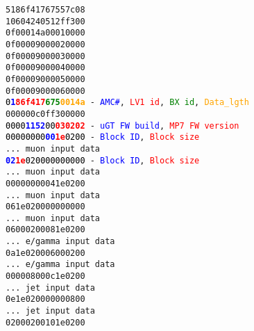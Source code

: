 \texttt{5186f41767557c08}\\
\texttt{10604240512ff300}\\
\texttt{0f00014a00010000}\\
\texttt{0f00009000020000}\\
\texttt{0f00009000030000}\\
\texttt{0f00009000040000}\\
\texttt{0f00009000050000}\\
\texttt{0f00009000060000}\\
\texttt{\textcolor{black}{0}\textcolor{blue}{\textbf{1}}\textcolor{red}{\textbf{86f417}}\textcolor{green}{\textbf{675}}\textcolor{orange}{\textbf{0014a}} - \textcolor{blue}{AMC\#}, \textcolor{red}{LV1 id}, \textcolor{green}{BX id}, \textcolor{orange}{Data\_lgth}}\\
\texttt{000000c0ff300000}\\
\texttt{\textcolor{black}{0000}\textcolor{blue}{\textbf{1152}}\textcolor{black}{00}\textcolor{red}{\textbf{030202}} - \textcolor{blue}{uGT FW build}, \textcolor{red}{MP7 FW version}}\\
\texttt{\textcolor{black}{00000000}\textcolor{blue}{\textbf{00}}\textcolor{red}{\textbf{1e}}\textcolor{black}{0200} - \textcolor{blue}{Block ID}, \textcolor{red}{Block size}}\\
\texttt{... muon input data}\\
\texttt{\textcolor{blue}{\textbf{02}}\textcolor{red}{\textbf{1e}}\textcolor{black}{020000000000} - \textcolor{blue}{Block ID}, \textcolor{red}{Block size}}\\
\texttt{... muon input data}\\
\texttt{00000000041e0200}\\
\texttt{... muon input data}\\
\texttt{061e020000000000}\\
\texttt{... muon input data}\\
\texttt{06000200081e0200}\\
\texttt{... e/gamma input data}\\
\texttt{0a1e020006000200}\\
\texttt{... e/gamma input data}\\
\texttt{000008000c1e0200}\\
\texttt{... jet input data}\\
\texttt{0e1e020000000800}\\
\texttt{... jet input data}\\
\texttt{02000200101e0200}\\
